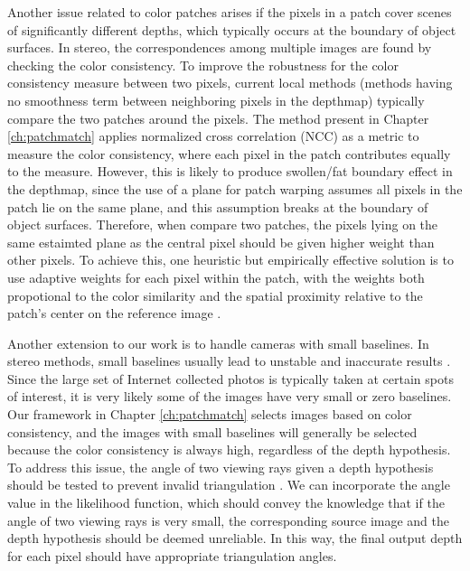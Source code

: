 Another issue related to color patches arises if the pixels in a patch cover scenes of significantly different depths, which typically occurs at the boundary of object surfaces. 
In stereo, the correspondences among multiple images are found by checking the color consistency.
To improve the robustness for the color consistency measure between two pixels, current local methods (\ie methods having no smoothness term between neighboring pixels in the depthmap) typically compare the two patches around the pixels. The method present in Chapter \ref{ch:patchmatch} applies normalized cross correlation (NCC) as a metric to measure the color consistency, where each pixel in the patch contributes equally to the measure. 
However, this is likely to produce swollen/fat boundary effect in the depthmap, since the use of a plane for patch warping assumes all pixels in the patch lie on the same plane, and this assumption breaks at the boundary of object surfaces. 
Therefore, when compare two patches, the pixels lying on the same estaimted plane as the central pixel should be given higher weight than other pixels. To achieve this, one heuristic but empirically effective solution is to use adaptive weights for each pixel within the patch, with the weights both propotional to the color similarity and the spatial proximity relative to the patch's center on the reference image \cite{Yoon06adaptivesupport_weight}. 

Another extension to our work is to handle cameras with small baselines. In stereo methods, small baselines usually lead to unstable and inaccurate results \cite{Hartley2004}. Since the large set of Internet collected photos is typically taken at certain spots of interest, it is very likely some of the images have very small or zero baselines. Our framework in Chapter \ref{ch:patchmatch} selects images based on color consistency, and the images with small baselines will generally be selected because the color consistency is always high, regardless of the depth hypothesis. To address this issue, the angle of two viewing rays given a depth hypothesis should be tested to prevent invalid triangulation \cite{Gallup08}. We can incorporate the angle value in the likelihood function, which should convey the knowledge that if the angle of two viewing rays is very small, the corresponding source image and the depth hypothesis should be deemed unreliable. In this way, the final output depth for each pixel should have appropriate triangulation angles.

